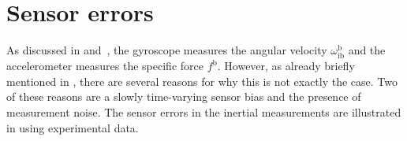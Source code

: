 \section{Sensor errors}
\label{sec:sensors-errors}
As discussed in  and~, the gyroscope measures the angular velocity $\omega^\text{b}_\text{ib}$ and the accelerometer measures the specific force $f^\text{b}$. However, as already briefly mentioned in , there are several reasons for why this is not exactly the case. Two of these reasons are a slowly time-varying sensor bias and the presence of measurement noise. The sensor errors in the inertial measurements are illustrated in  using experimental data. 

\newpage 

